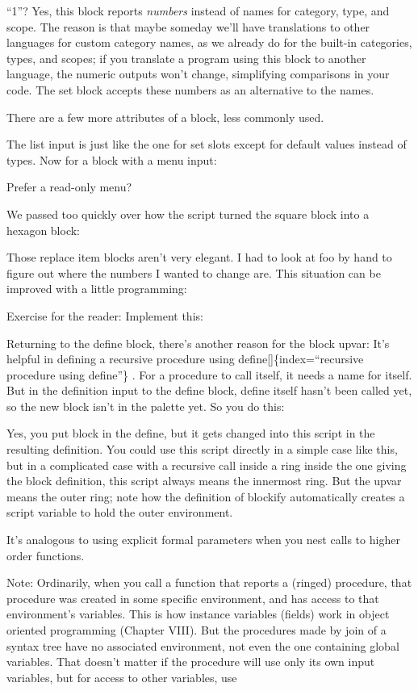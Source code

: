 \documentclass[
  letterpaper,
]{book}
\begin{document}
``1''? Yes, this block reports \emph{numbers} instead of names for
category, type, and scope. The reason is that maybe someday we'll have
translations to other languages for custom category names, as we already
do for the built-in categories, types, and scopes; if you translate a
program using this block to another language, the numeric outputs won't
change, simplifying comparisons in your code. The set block accepts
these numbers as an alternative to the names.

There are a few more attributes of a block, less commonly used.

The list input is just like the one for set slots except for default
values instead of types. Now for a block with a menu input:

Prefer a read-only menu?

We passed too quickly over how the script turned the square block into a
hexagon block:

Those replace item blocks aren't very elegant. I had to look at foo by
hand to figure out where the numbers I wanted to change are. This
situation can be improved with a little programming:

Exercise for the reader: Implement this:

Returning to the define block, there's another reason for the block
upvar: It's helpful in defining a recursive procedure using
define{[}{]}\{index=``recursive procedure using define''\} . For a
procedure to call itself, it needs a name for itself. But in the
definition input to the define block, define itself hasn't been called
yet, so the new block isn't in the palette yet. So you do this:

Yes, you put block in the define, but it gets changed into this script
in the resulting definition. You could use this script directly in a
simple case like this, but in a complicated case with a recursive call
inside a ring inside the one giving the block definition, this script
always means the innermost ring. But the upvar means the outer ring;
note how the definition of blockify automatically creates a script
variable to hold the outer environment.

It's analogous to using explicit formal parameters when you nest calls
to higher order functions.

Note: Ordinarily, when you call a function that reports a (ringed)
procedure, that procedure was created in some specific environment, and
has access to that environment's variables. This is how instance
variables (fields) work in object oriented programming (Chapter VIII).
But the procedures made by join of a syntax tree have no associated
environment, not even the one containing global variables. That doesn't
matter if the procedure will use only its own input variables, but for
access to other variables, use
\end{document}
